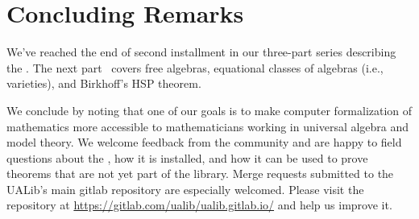 \section{Concluding Remarks}\label{sec:concluding-remarks}
We've reached the end of second installment in our three-part series describing
the \agdaualib.  The next part~\cite{DeMeo:2021-3} covers free algebras,
equational classes of algebras (i.e., varieties), and Birkhoff's HSP theorem. 



We conclude by noting that one of our goals is to make computer formalization of
mathematics more accessible to mathematicians working in universal algebra and
model theory. We welcome feedback from the community and are happy to field
questions about the \ualib, how it is installed, and how it can be used to prove
theorems that are not yet part of the library.  Merge requests submitted to the
UALib's main gitlab repository are especially welcomed.  Please visit the
repository at \url{https://gitlab.com/ualib/ualib.gitlab.io/} and help us
improve it. 



